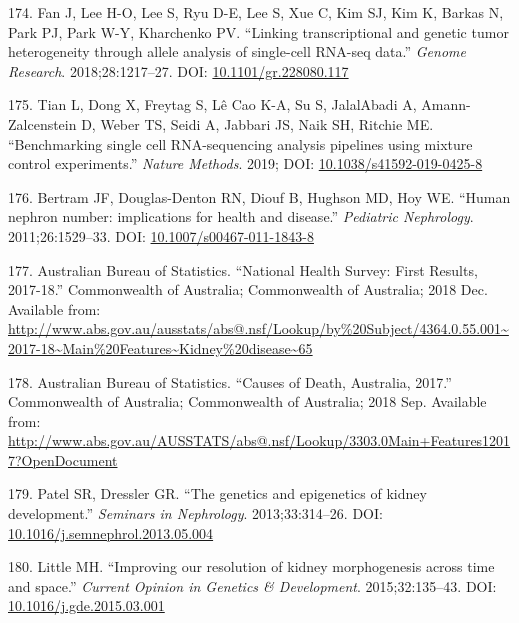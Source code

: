 \documentclass[11pt,a4paper,titlepage,twoside,openright]{style/unimelbthesis}
\theoremstyle{definition}
\theoremstyle{definition}
\theoremstyle{definition}
\theoremstyle{remark}
\begin{document}
\begin{mainmatter}
\leavevmode\hypertarget{ref-Fan2018-ki}{}%
174. Fan J, Lee H-O, Lee S, Ryu D-E, Lee S, Xue C, Kim SJ, Kim K, Barkas N, Park PJ, Park W-Y, Kharchenko PV. ``Linking transcriptional and genetic tumor heterogeneity through allele analysis of single-cell RNA-seq data.'' \emph{Genome Research}. 2018;28:1217--27. DOI: \href{https://doi.org/10.1101/gr.228080.117}{10.1101/gr.228080.117}

\leavevmode\hypertarget{ref-Tian2019-wl}{}%
175. Tian L, Dong X, Freytag S, Lê Cao K-A, Su S, JalalAbadi A, Amann-Zalcenstein D, Weber TS, Seidi A, Jabbari JS, Naik SH, Ritchie ME. ``Benchmarking single cell RNA-sequencing analysis pipelines using mixture control experiments.'' \emph{Nature Methods}. 2019; DOI: \href{https://doi.org/10.1038/s41592-019-0425-8}{10.1038/s41592-019-0425-8}

\leavevmode\hypertarget{ref-Bertram2011-kk}{}%
176. Bertram JF, Douglas-Denton RN, Diouf B, Hughson MD, Hoy WE. ``Human nephron number: implications for health and disease.'' \emph{Pediatric Nephrology}. 2011;26:1529--33. DOI: \href{https://doi.org/10.1007/s00467-011-1843-8}{10.1007/s00467-011-1843-8}

\leavevmode\hypertarget{ref-Australian_Bureau_of_Statistics2018-uz}{}%
177. Australian Bureau of Statistics. ``National Health Survey: First Results, 2017-18.'' Commonwealth of Australia; Commonwealth of Australia; 2018 Dec. Available from: \url{http://www.abs.gov.au/ausstats/abs@.nsf/Lookup/by\%20Subject/4364.0.55.001~2017-18~Main\%20Features~Kidney\%20disease~65}

\leavevmode\hypertarget{ref-Australian_Bureau_of_Statistics2018-ms}{}%
178. Australian Bureau of Statistics. ``Causes of Death, Australia, 2017.'' Commonwealth of Australia; Commonwealth of Australia; 2018 Sep. Available from: \url{http://www.abs.gov.au/AUSSTATS/abs@.nsf/Lookup/3303.0Main+Features12017?OpenDocument}

\leavevmode\hypertarget{ref-Patel2013-vh}{}%
179. Patel SR, Dressler GR. ``The genetics and epigenetics of kidney development.'' \emph{Seminars in Nephrology}. 2013;33:314--26. DOI: \href{https://doi.org/10.1016/j.semnephrol.2013.05.004}{10.1016/j.semnephrol.2013.05.004}

\leavevmode\hypertarget{ref-Little2015-wm}{}%
180. Little MH. ``Improving our resolution of kidney morphogenesis across time and space.'' \emph{Current Opinion in Genetics \& Development}. 2015;32:135--43. DOI: \href{https://doi.org/10.1016/j.gde.2015.03.001}{10.1016/j.gde.2015.03.001}


\end{mainmatter}
\end{document}
